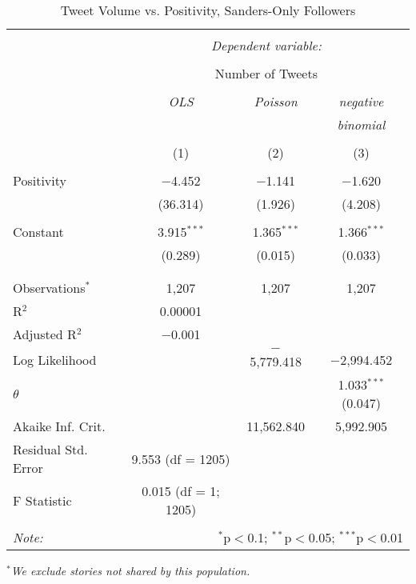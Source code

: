 \begin{table}[!htbp] \centering 
  \caption{Tweet Volume vs. Positivity, Sanders-Only Followers} 
  \label{} 
    \begin{tabular}{@{\extracolsep{5pt}}lccc} 
    \\[-1.8ex]\hline 
    \hline \\[-1.8ex] 
     & \multicolumn{3}{c}{\textit{Dependent variable:}} \\ 
    \cline{2-4} 
    \\[-1.8ex] & \multicolumn{3}{c}{Number of Tweets} \\ 
    \\[-1.8ex] & \textit{OLS} & \textit{Poisson} & \textit{negative} \\ 
     & \textit{} & \textit{} & \textit{binomial} \\ 
    \\[-1.8ex] & (1) & (2) & (3)\\ 
    \hline \\[-1.8ex] 
     Positivity & $-$4.452 & $-$1.141 & $-$1.620 \\ 
      & (36.314) & (1.926) & (4.208) \\ 
      & & & \\ 
     Constant & 3.915$^{***}$ & 1.365$^{***}$ & 1.366$^{***}$ \\ 
      & (0.289) & (0.015) & (0.033) \\ 
      & & & \\ 
    \hline \\[-1.8ex] 
    Observations$^{*}$ & 1,207 & 1,207 & 1,207 \\ 
    R$^{2}$ & 0.00001 &  &  \\ 
    Adjusted R$^{2}$ & $-$0.001 &  &  \\ 
    Log Likelihood &  & $-$5,779.418 & $-$2,994.452 \\ 
    $\theta$ &  &  & 1.033$^{***}$  (0.047) \\ 
    Akaike Inf. Crit. &  & 11,562.840 & 5,992.905 \\ 
    Residual Std. Error & 9.553 (df = 1205) &  &  \\ 
    F Statistic & 0.015 (df = 1; 1205) &  &  \\ 
    \hline 
    \hline \\[-1.8ex] 
    \textit{Note:}  & \multicolumn{3}{r}{$^{*}$p$<$0.1; $^{**}$p$<$0.05; $^{***}$p$<$0.01} \\ 
    \end{tabular} 
\end{table} 
\emph{$^{*}$We exclude stories not shared by this population.} 
\newpage 

